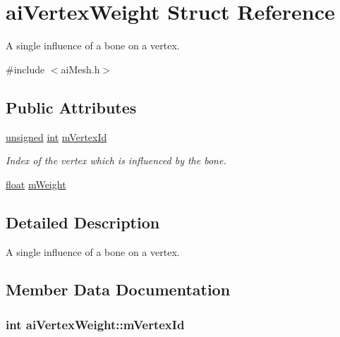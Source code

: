 \hypertarget{structai_vertex_weight}{\section{ai\-Vertex\-Weight Struct Reference}
\label{structai_vertex_weight}
}


A single influence of a bone on a vertex.  




{\ttfamily \#include $<$ai\-Mesh.\-h$>$}

\subsection*{Public Attributes}
\begin{DoxyCompactItemize}
\item 
\hyperlink{_free_image_8h_a425076c7067a1b5166e2cc530e914814}{unsigned} \hyperlink{wglew_8h_a500a82aecba06f4550f6849b8099ca21}{int} \hyperlink{structai_vertex_weight_af6269cf6a0f02e5ae870a72046d58f4f}{m\-Vertex\-Id}
\begin{DoxyCompactList}\small\item\em Index of the vertex which is influenced by the bone. \end{DoxyCompactList}\item 
\hyperlink{fmod_8h_aeb841aa4b4b5f444b5d739d865b420af}{float} \hyperlink{structai_vertex_weight_abab9c49baabc2cafef9ac840f59e61b8}{m\-Weight}
\end{DoxyCompactItemize}


\subsection{Detailed Description}
A single influence of a bone on a vertex. 

\subsection{Member Data Documentation}
\hypertarget{structai_vertex_weight_af6269cf6a0f02e5ae870a72046d58f4f}{
\subsubsection[{m\-Vertex\-Id}]{ {\bf int} ai\-Vertex\-Weight\-::m\-Vertex\-Id}}\label{structai_vertex_weight_af6269cf6a0f02e5ae870a72046d58f4f}


